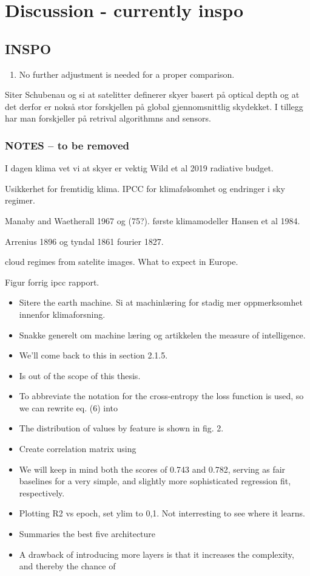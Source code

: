 \chapter{Discussion - currently inspo}
\section{INSPO}
\begin{enumerate}
    \item No further adjustment is needed for a proper comparison.
\end{enumerate}

Siter Schubenau og si at satelitter definerer skyer basert på optical depth og at det derfor er nokså stor forskjellen på global gjennomsnittlig skydekket. I tillegg har man forskjeller på retrival algorithmns and sensors. 

\subsection{NOTES -- to be removed}
I dagen klima vet vi at skyer er vektig
Wild et al 2019 radiative budget.

Usikkerhet for fremtidig klima.
IPCC for klimafølsomhet og endringer i sky regimer. 

Manaby and Waetherall 1967 og (75?). første klimamodeller 
Hansen et al 1984.

Arrenius 1896 og tyndal 1861 fourier 1827.

cloud regimes from satelite images. What to expect in Europe. 

Figur forrig ipcc rapport. 

\begin{itemize}
    \item Sitere the earth machine. Si at machinlæring for stadig mer oppmerksomhet innenfor klimaforsning. 
    \item Snakke generelt om machine læring og artikkelen the measure of intelligence. 
    \item We’ll come back to this in section 2.1.5.
    \item Is out of the scope of this thesis.
    \item To abbreviate the notation for the cross-entropy the loss function is used, so we can rewrite eq. (6) into
    \item The distribution of values
    by feature is shown in fig. 2.
    \item Create correlation matrix using 
    \item We will keep in mind both the scores of 0.743 and 0.782, serving
    as fair baselines for a very simple, and slightly more sophisticated
    regression fit, respectively.
    \item Plotting R2 vs epoch, set ylim to 0,1. Not interresting to see where it learns.
    \item Summaries the best five architecture 
    \item A drawback of introducing more layers
    is that it increases the complexity, and thereby the chance of
 \end{itemize}


